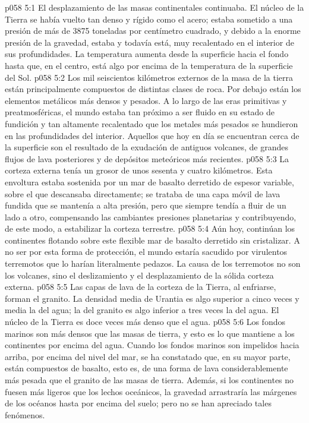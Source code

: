 \vs p058 5:1 El desplazamiento de las masas continentales continuaba. El núcleo de la Tierra se había vuelto tan denso y rígido como el acero; estaba sometido a una presión de más de 3875 toneladas por centímetro cuadrado, y debido a la enorme presión de la gravedad, estaba y todavía está, muy recalentado en el interior de sus profundidades. La temperatura aumenta desde la superficie hacia el fondo hasta que, en el centro, está algo por encima de la temperatura de la superficie del Sol.
\vs p058 5:2 Los mil seiscientos kilómetros externos de la masa de la tierra están principalmente compuestos de distintas clases de roca. Por debajo están los elementos metálicos más densos y pesados. A lo largo de las eras primitivas y preatmosféricas, el mundo estaba tan próximo a ser fluido en su estado de fundición y tan altamente recalentado que los metales más pesados se hundieron en las profundidades del interior. Aquellos que hoy en día se encuentran cerca de la superficie son el resultado de la exudación de antiguos volcanes, de grandes flujos de lava posteriores y de depósitos meteóricos más recientes.
\vs p058 5:3 La corteza externa tenía un grosor de unos sesenta y cuatro kilómetros. Esta envoltura estaba sostenida por un mar de basalto derretido de espesor variable, sobre el que descansaba directamente; se trataba de una capa móvil de lava fundida que se mantenía a alta presión, pero que siempre tendía a fluir de un lado a otro, compensando las cambiantes presiones planetarias y contribuyendo, de este modo, a estabilizar la corteza terrestre.
\vs p058 5:4 Aún hoy, continúan los continentes flotando sobre este flexible mar de basalto derretido sin cristalizar. A no ser por esta forma de protección, el mundo estaría sacudido por virulentos terremotos que lo harían literalmente pedazos. La causa de los terremotos no son los volcanes, sino el deslizamiento y el desplazamiento de la sólida corteza externa.
\vs p058 5:5 \pc Las capas de lava de la corteza de la Tierra, al enfriarse, forman el granito. La densidad media de Urantia es algo superior a cinco veces y media la del agua; la del granito es algo inferior a tres veces la del agua. El núcleo de la Tierra es doce veces más denso que el agua.
\vs p058 5:6 Los fondos marinos son más densos que las masas de tierra, y esto es lo que mantiene a los continentes por encima del agua. Cuando los fondos marinos son impelidos hacia arriba, por encima del nivel del mar, se ha constatado que, en su mayor parte, están compuestos de basalto, esto es, de una forma de lava considerablemente más pesada que el granito de las masas de tierra. Además, si los continentes no fuesen más ligeros que los lechos oceánicos, la gravedad arrastraría las márgenes de los océanos hasta por encima del suelo; pero no se han apreciado tales fenómenos.
